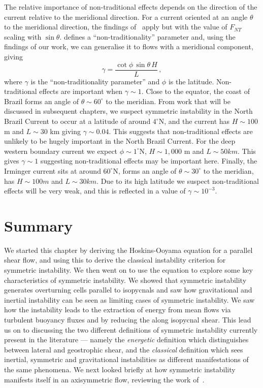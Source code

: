     The relative importance of non-traditional effects depends on the direction of the current relative to the meridional direction. For a current oriented at an angle $\theta$ to the meridional direction, the findings of~\citet{Zeitlin2018a} apply but with the value of $F_{NT}$ scaling with $\sin \theta$. \citet{Zeitlin2018a} defines a ``non-traditionality'' parameter and, using the findings of our work, we can generalise it to flows with a meridional component, giving
    \begin{equation}
        \gamma = \frac{\cot\phi\,\sin \theta\,H}{L} \, ,
    \end{equation}
    where $\gamma$ is the  ``non-traditionality parameter'' and $\phi$ is the latitude. Non-traditional effects are important when $\gamma \sim 1$. Close to the equator, the coast of Brazil forms an angle of $\theta \sim 60^\circ$ to the meridian. From work that will be discussed in subsequent chapters, we suspect symmetric instability in the North Brazil Current to occur at a latitude of around $4^\circ$N, and the current has $H\sim100$ m and $L\sim30$ km giving $\gamma \sim 0.04$. This suggests that non-traditional effects are unlikely to be hugely important in the North Brazil Current. For the deep western boundary current we expect $\phi \sim 1^\circ$N, $H\sim 1,000$ m and $L \sim 50 km$. This gives $\gamma \sim 1$ suggesting non-traditional effects may be important here. Finally, the Irminger current sits at around $60^\circ$N, forms an angle of $\theta \sim 30^\circ$ to the meridian, has $H \sim 100 m$ and $L \sim 30 km$. Due to its high latitude we suspect non-traditional effects will be very weak, and this is reflected in a value of $\gamma \sim 10^{-3}$.

\section{Summary}
We started this chapter by deriving the Hoskins-Ooyama equation for a parallel shear flow, and using this to derive the classical instability criterion for symmetric instability. We then went on to use the equation to explore some key characteristics of symmetric instability. We showed that symmetric instability generates overturning cells parallel to isopycnals and saw how gravitational and inertial instability can be seen as limiting cases of symmetric instability. We saw how the instability leads to the extraction of energy from mean flows via turbulent buoyancy fluxes and by reducing the along isopycnal shear. This lead us on to discussing the two different definitions of symmetric instability currently present in the literature --- namely the \textit{energetic} definition which distinguishes between lateral and geostrophic shear, and the \textit{classical} definition which sees inertial, symmetric and gravitational instabilities as different manifestations of the same phenomena. We next looked briefly at how symmetric instability manifests itself in an axisymmetric flow, reviewing the work of~\citet{Buckingham2021}.

